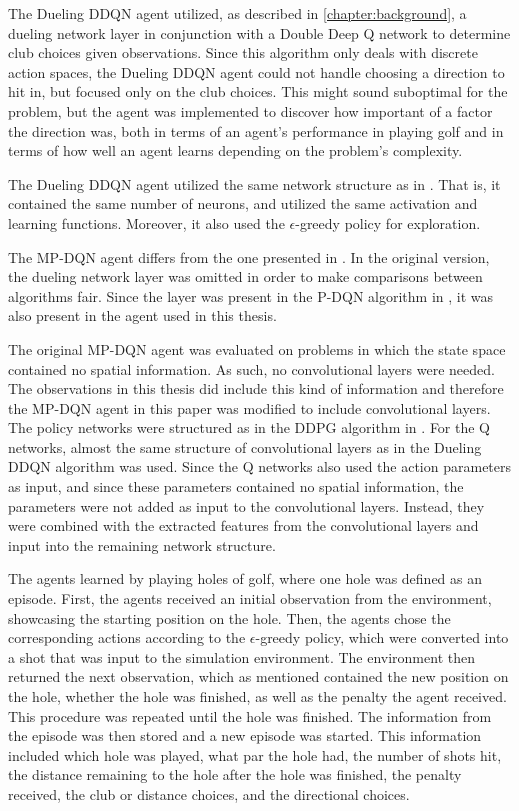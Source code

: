 \documentclass{kththesis}
\begin{document}
The Dueling DDQN agent utilized, as described in \autoref{chapter:background}, a dueling network layer in conjunction with a Double Deep Q network to determine club choices given observations. Since this algorithm only deals with discrete action spaces, the Dueling DDQN agent could not handle choosing a direction to hit in, but focused only on the club choices. This might sound suboptimal for the problem, but the agent was implemented to discover how important of a factor the direction was, both in terms of an agent's performance in playing golf and in terms of how well an agent learns depending on the problem's complexity. 

The Dueling DDQN agent utilized the same network structure as in \textcite{wang2015dueling}. That is, it contained the same number of neurons, and utilized the same activation and learning functions. Moreover, it also used the $\epsilon$-greedy policy for exploration.

The MP-DQN agent differs from the one presented in \textcite{bester2019mpdqn}. In the original version, the dueling network layer was omitted in order to make comparisons between algorithms fair. Since the layer was present in the P-DQN algorithm in \textcite{xiong2018parametrized}, it was also present in the agent used in this thesis. 

The original MP-DQN agent was evaluated on problems in which the state space contained no spatial information. As such, no convolutional layers were needed. The observations in this thesis did include this kind of information and therefore the MP-DQN agent in this paper was modified to include convolutional layers. The policy networks were structured as in the DDPG algorithm in \textcite{lillicrap2015continuous}. For the Q networks, almost the same structure of convolutional layers as in the Dueling DDQN algorithm was used. Since the Q networks also used the action parameters as input, and since these parameters contained no spatial information, the parameters were not added as input to the convolutional layers. Instead, they were combined with the extracted features from the convolutional layers and input into the remaining network structure.

The agents learned by playing holes of golf, where one hole was defined as an episode. First, the agents received an initial observation from the environment, showcasing the starting position on the hole. Then, the agents chose the corresponding actions according to the $\epsilon$-greedy policy, which were converted into a shot that was input to the simulation environment. The environment then returned the next observation, which as mentioned contained the new position on the hole, whether the hole was finished, as well as the penalty the agent received. This procedure was repeated until the hole was finished. The information from the episode was then stored and a new episode was started. This information included which hole was played, what par the hole had, the number of shots hit, the distance remaining to the hole after the hole was finished, the penalty received, the club or distance choices, and the directional choices.
\end{document}
